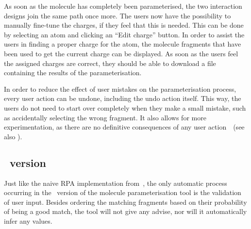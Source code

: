 As soon as the molecule has completely been parameterised, the two interaction designs join the same path once more. The users now have the possibility to manually fine-tune the charges, if they feel that this is needed. This can be done by selecting an atom and clicking an ``Edit charge'' button. In order to assist the users in finding a proper charge for the atom, the molecule fragments that have been used to get the current charge can be displayed. As soon as the users feel the assigned charges are correct, they should be able to download a file containing the results of the parameterisation.

In order to reduce the effect of user mistakes on the parameterisation process, every user action can be undone, including the undo action itself. This way, the users do not need to start over completely when they make a small mistake, such as accidentally selecting the wrong fragment. It also allows for more experimentation, as there are no definitive consequences of any user action~\cite{norman2002design,norman2010gestural}~(see also ).


\subsection{\IDA\ version}
Just like the naive RPA implementation from~\cite{payne2000varying}, the only automatic process occurring in the \IDa\ version of the molecule parameterisation tool is the validation of user input. Besides ordering the matching fragments based on their probability of being a good match, the tool will not give any advise, nor will it automatically infer any values.

